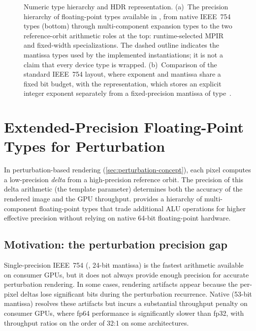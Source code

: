 \begin{figure}[!htbp]
\begin{tikzpicture}
\end{tikzpicture}
\caption[Numeric type hierarchy and HDR representation]{%
  Numeric type hierarchy and HDR representation.
  (a)~The precision hierarchy of floating-point types available in
  \FractalShark{}, from native IEEE~754 types (bottom) through
  multi-component expansion types to the two reference-orbit arithmetic roles
  at the top: runtime-selected MPIR and fixed-width 
  specializations.  The dashed outline indicates the mantissa types used by the
  implemented  instantiations; it is not a claim that every
  device type is wrapped.
  (b)~Comparison of the standard IEEE~754  layout, where
  exponent and mantissa share a fixed bit budget, with the
   representation, which stores an explicit integer
  exponent separately from a fixed-precision mantissa of type~.}
\label{fig:type-hierarchy}
\end{figure}


\section{Extended-Precision Floating-Point Types for Perturbation}
\label{sec:extended-precision-types}

In perturbation-based rendering (\cref{sec:perturbation-concept}), each pixel
computes a low-precision \emph{delta} from a high-precision reference orbit.
The precision of this delta arithmetic (the  template parameter)
determines both the accuracy of the rendered image and the GPU throughput.
\FractalShark{} provides a hierarchy of multi-component floating-point types
that trade additional ALU operations for higher effective precision without
relying on native 64-bit floating-point hardware.

\subsection{Motivation: the perturbation precision gap}
\label{subsec:ep-motivation}

Single-precision IEEE~754 (, 24-bit mantissa) is the fastest
arithmetic available on consumer GPUs, but it does not always provide enough
precision for accurate perturbation rendering.  In some cases,
rendering artifacts appear because the per-pixel deltas lose significant bits
during the perturbation recurrence.  Native  (53-bit mantissa)
resolves these artifacts but incurs a substantial throughput penalty on consumer
GPUs, where fp64 performance is significantly slower than fp32, with throughput ratios on the order of 32:1 on some architectures.

